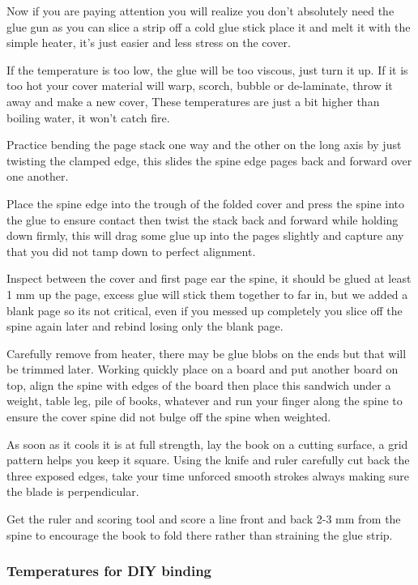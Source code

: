 \documentclass[
]{article}
\begin{document}
Now if you are paying attention you will realize you don't absolutely
need the glue gun as you can slice a strip off a cold glue stick place
it and melt it with the simple heater, it's just easier and less stress
on the cover.

If the temperature is too low, the glue will be too viscous, just turn
it up. If it is too hot your cover material will warp, scorch, bubble or
de-laminate, throw it away and make a new cover, These temperatures are
just a bit higher than boiling water, it won't catch fire.

Practice bending the page stack one way and the other on the long axis
by just twisting the clamped edge, this slides the spine edge pages back
and forward over one another.

Place the spine edge into the trough of the folded cover and press the
spine into the glue to ensure contact then twist the stack back and
forward while holding down firmly, this will drag some glue up into the
pages slightly and capture any that you did not tamp down to perfect
alignment.

Inspect between the cover and first page ear the spine, it should be
glued at least 1 mm up the page, excess glue will stick them together to
far in, but we added a blank page so its not critical, even if you
messed up completely you slice off the spine again later and rebind
losing only the blank page.

Carefully remove from heater, there may be glue blobs on the ends but
that will be trimmed later. Working quickly place on a board and put
another board on top, align the spine with edges of the board then place
this sandwich under a weight, table leg, pile of books, whatever and run
your finger along the spine to ensure the cover spine did not bulge off
the spine when weighted.

As soon as it cools it is at full strength, lay the book on a cutting
surface, a grid pattern helps you keep it square. Using the knife and
ruler carefully cut back the three exposed edges, take your time
unforced smooth strokes always making sure the blade is perpendicular.

Get the ruler and scoring tool and score a line front and back 2-3 mm
from the spine to encourage the book to fold there rather than straining
the glue strip.

\subsubsection{Temperatures for DIY binding}
\end{document}
